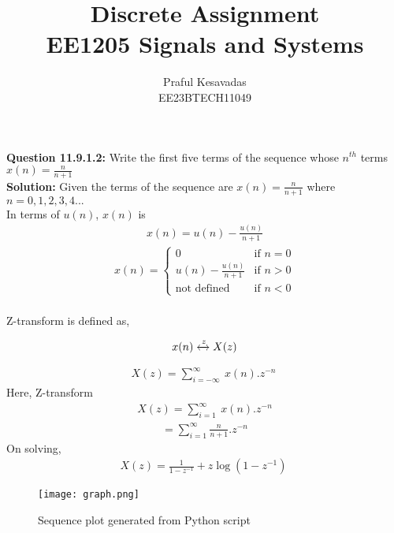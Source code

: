 \documentclass{article}
\begin{document}
\title{
\Huge\textbf{Discrete Assignment}\\
\Huge\textbf{EE1205} Signals and Systems\\
}
\large\author{Praful Kesavadas\\EE23BTECH11049}
\maketitle
\textbf{Question 11.9.1.2:}
Write the first five terms of the sequence whose $n^{th}$ terms  $x(n) = \frac{n}{n+1}$\\
\textbf{Solution:}
Given the terms of the sequence are $x(n) = \frac{n}{n+1}$ where $n = 0,1,2,3,4...$\\
In terms of $u(n)$, $x(n)$ is\\
\begin{align}
x(n) = u(n) -\frac{u(n)}{n+1}
\end{align}
\begin{align*}
    x(n) = 
    \begin{cases}
        0 & \text{if }n=0\\
        u(n) -\frac{u(n)}{n+1} & \text{if }n > 0\\
        \text{not defined } & \text{if }n <0
    \end{cases}
\end{align*}\\
Z-transform is defined as, 

$$ x(n) \xleftrightarrow z  X(z)$$

\begin{align}
X(z) =  \sum_{i=-\infty}^\infty\ x(n).z^{-n}\
\end{align}
Here, Z-transform
\begin{align}
X(z) = \sum_{i=1}^\infty\ x(n).z^{-n}
\end{align}
\begin{align}
= \sum_{i=1}^\infty \frac{n}{n+1} . z^{-n}
\end{align}
On solving, 
\begin{align}
X(z) = \frac{1}{1-z^{-1}} + z\log{(1-z^{-1})}\
\end{align}
\begin{figure}[h]
    \centering
    \texttt{[image: graph.png]}
    \caption{Sequence plot generated from Python script}
    \label{fig:sequence-plot}
\end{figure}
\end{document}
